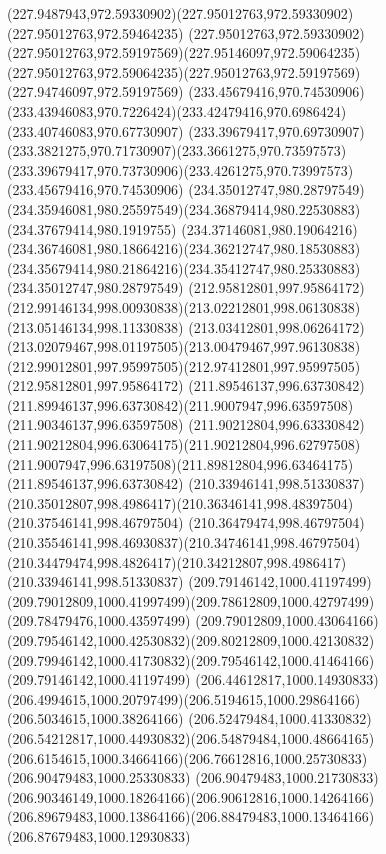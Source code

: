 {{  \curveto(227.9487943,972.59330902)(227.95012763,972.59330902)(227.95012763,972.59464235)
  \curveto(227.95012763,972.59330902)(227.95012763,972.59197569)(227.95146097,972.59064235)
  \curveto(227.95012763,972.59064235)(227.95012763,972.59197569)(227.94746097,972.59197569)
  \moveto(233.45679416,970.74530906)
  \curveto(233.43946083,970.7226424)(233.42479416,970.6986424)(233.40746083,970.67730907)
  \curveto(233.39679417,970.69730907)(233.3821275,970.71730907)(233.3661275,970.73597573)
  \curveto(233.39679417,970.73730906)(233.4261275,970.73997573)(233.45679416,970.74530906)
  \moveto(234.35012747,980.28797549)
  \curveto(234.35946081,980.25597549)(234.36879414,980.22530883)(234.37679414,980.1919755)
  \curveto(234.37146081,980.19064216)(234.36746081,980.18664216)(234.36212747,980.18530883)
  \curveto(234.35679414,980.21864216)(234.35412747,980.25330883)(234.35012747,980.28797549)
  \moveto(212.95812801,997.95864172)
  \curveto(212.99146134,998.00930838)(213.02212801,998.06130838)(213.05146134,998.11330838)
  \curveto(213.03412801,998.06264172)(213.02079467,998.01197505)(213.00479467,997.96130838)
  \curveto(212.99012801,997.95997505)(212.97412801,997.95997505)(212.95812801,997.95864172)
  \moveto(211.89546137,996.63730842)
  \curveto(211.89946137,996.63730842)(211.9007947,996.63597508)(211.90346137,996.63597508)
  \curveto(211.90212804,996.63330842)(211.90212804,996.63064175)(211.90212804,996.62797508)
  \curveto(211.9007947,996.63197508)(211.89812804,996.63464175)(211.89546137,996.63730842)
  \moveto(210.33946141,998.51330837)
  \curveto(210.35012807,998.4986417)(210.36346141,998.48397504)(210.37546141,998.46797504)
  \curveto(210.36479474,998.46797504)(210.35546141,998.46930837)(210.34746141,998.46797504)
  \curveto(210.34479474,998.4826417)(210.34212807,998.4986417)(210.33946141,998.51330837)
  \moveto(209.79146142,1000.41197499)
  \curveto(209.79012809,1000.41997499)(209.78612809,1000.42797499)(209.78479476,1000.43597499)
  \curveto(209.79012809,1000.43064166)(209.79546142,1000.42530832)(209.80212809,1000.42130832)
  \curveto(209.79946142,1000.41730832)(209.79546142,1000.41464166)(209.79146142,1000.41197499)
  \moveto(206.44612817,1000.14930833)
  \curveto(206.4994615,1000.20797499)(206.5194615,1000.29864166)(206.5034615,1000.38264166)
  \curveto(206.52479484,1000.41330832)(206.54212817,1000.44930832)(206.54879484,1000.48664165)
  \curveto(206.6154615,1000.34664166)(206.76612816,1000.25730833)(206.90479483,1000.25330833)
  \curveto(206.90479483,1000.21730833)(206.90346149,1000.18264166)(206.90612816,1000.14264166)
  \curveto(206.89679483,1000.13864166)(206.88479483,1000.13464166)(206.87679483,1000.12930833)
}}
